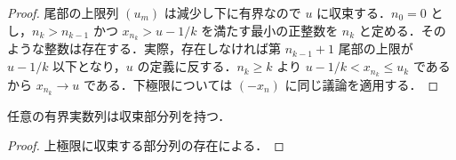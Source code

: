\begin{proof}
尾部の上限列 $(u_m)$ は減少し下に有界なので $u$ に収束する．$n_0=0$ とし，$n_k>n_{k-1}$ かつ $x_{n_k}>u-1/k$ を満たす最小の正整数を $n_k$ と定める．そのような整数は存在する．実際，存在しなければ第 $n_{k-1}+1$ 尾部の上限が $u-1/k$ 以下となり，$u$ の定義に反する．$n_k\geq k$ より $u-1/k<x_{n_k}\leq u_k$ であるから $x_{n_k}\to u$ である．下極限については $(-x_n)$ に同じ議論を適用する．
\end{proof}
\begin{prop}
任意の有界実数列は収束部分列を持つ．
\end{prop}
\begin{proof}
上極限に収束する部分列の存在による．
\end{proof}
